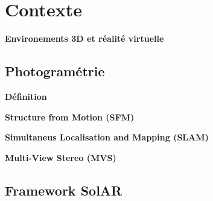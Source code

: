 \chapter{Contexte}

\par
\textbf{Environements 3D et réalité virtuelle}

\section{Photogramétrie}

\par
\textbf{Définition}

\par
\textbf{Structure from Motion (SFM)}

\par
\textbf{Simultaneus Localisation and Mapping (SLAM)}

\par
\textbf{Multi-View Stereo (MVS)}

\section{Framework SolAR}

